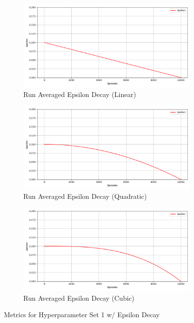 \documentclass[a4paper,9pt]{scrartcl}
\begin{document}
\begin{figure}[H]
\centering
\begin{subfigure}[b]{0.32\textwidth}
\includegraphics[width=\textwidth]{images/q_learning_epsilon_avg(2)(0).png}
\caption{Run Averaged Epsilon Decay (Linear)}
\label{fig:rewards_avg}
\end{subfigure}
\hfill
\begin{subfigure}[b]{0.32\textwidth}
\includegraphics[width=\textwidth]{images/q_learning_epsilon_avg(2)(1).png}
\caption{Run Averaged Epsilon Decay (Quadratic)}
\label{fig:epsilon_avg}
\end{subfigure}
\hfill
\begin{subfigure}[b]{0.32\textwidth}
\includegraphics[width=\textwidth]{images/q_learning_epsilon_avg(2)(2).png}
\caption{Run Averaged Epsilon Decay (Cubic)}
\label{fig:win_percent_avg}
\end{subfigure}
\caption{Metrics for Hyperparameter Set 1 w/ Epsilon Decay}
\label{fig:training_metrics}
\end{figure}
\end{document}
